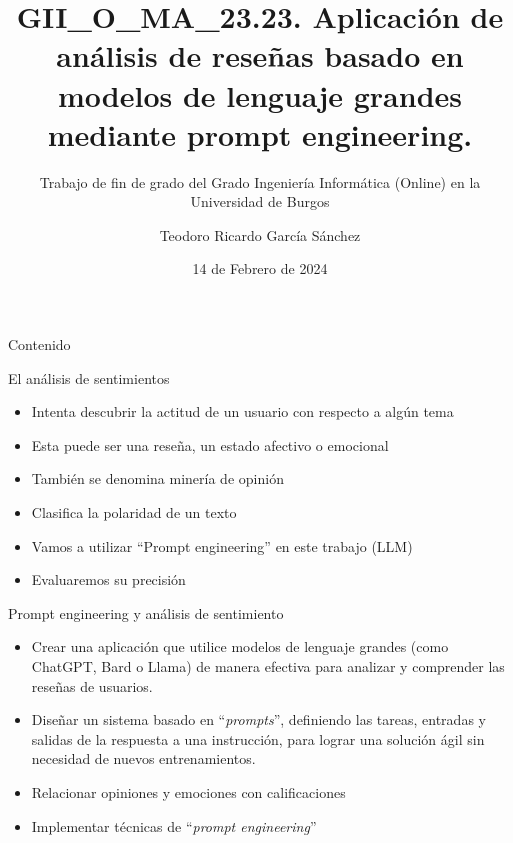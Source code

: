 \documentclass[aspectratio=169,xcolor=dvipsnames, t]{beamer}
\title[Prompt sentiment]{GII\_O\_MA\_23.23. Aplicación de análisis de reseñas basado en modelos de lenguaje grandes mediante prompt engineering.} %
\subtitle{Trabajo de fin de grado del Grado Ingeniería Informática (Online) en la Universidad de Burgos}
\author[García Sánchez]{Teodoro Ricardo García Sánchez}
\institute[Grado de Ingeniería Informática (Online)]{Dra. Virginia Ahedo García\\Dr. José Ignacio Santos Martín}
\date{14 de Febrero de 2024} %
\begin{document}
\maketitlepage

\begin{frame}[t]{Contenido}
    \tableofcontents
\end{frame}


\begin{frame}{El análisis de sentimientos}
    \begin{itemize}
        \item Intenta descubrir la actitud de un usuario con respecto a algún tema
        \item Esta puede ser una reseña, un estado afectivo o emocional
        \item También se denomina minería de opinión
        \item Clasifica la polaridad de un texto
        \item Vamos a utilizar ``Prompt engineering'' en este trabajo (LLM)
        \item Evaluaremos su precisión
    \end{itemize}
\end{frame}


\begin{frame}{Prompt engineering y análisis de sentimiento}
    \begin{itemize}
        \item Crear una aplicación que utilice modelos de lenguaje grandes (como ChatGPT, Bard o Llama) de manera efectiva para analizar y comprender las reseñas de usuarios.
        \item Diseñar un sistema basado en ``\emph{prompts}'', definiendo las tareas, entradas y salidas de la respuesta a una instrucción, para lograr una solución ágil sin necesidad de nuevos entrenamientos.
        \item Relacionar opiniones y emociones con calificaciones
        \item Implementar técnicas de ``\emph{prompt engineering}''
    \end{itemize}
\end{frame}

\end{document}
